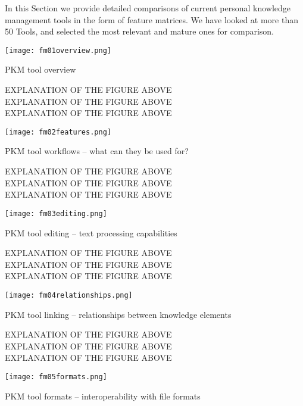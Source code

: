 In this Section we provide detailed comparisons of current personal knowledge management tools in the form of feature matrices. We have looked at more than 50 Tools, and selected the most relevant and mature ones for comparison.

\begin{table}[H]
    \centering
    \texttt{[image: fm01overview.png]}
    \caption{PKM tool overview}
    \label{fig:fm01}
\end{table}

EXPLANATION OF THE FIGURE ABOVE \\
EXPLANATION OF THE FIGURE ABOVE \\
EXPLANATION OF THE FIGURE ABOVE \\


\begin{table}[H]
    \centering
    \texttt{[image: fm02features.png]}
    \caption{PKM tool workflows -- what can they be used for?}
    \label{fig:fm02}
\end{table}

EXPLANATION OF THE FIGURE ABOVE \\
EXPLANATION OF THE FIGURE ABOVE \\
EXPLANATION OF THE FIGURE ABOVE \\


\begin{table}[H]
    \centering
    \texttt{[image: fm03editing.png]}
    \caption{PKM tool editing -- text processing capabilities}
    \label{fig:fm03}
\end{table}

EXPLANATION OF THE FIGURE ABOVE \\
EXPLANATION OF THE FIGURE ABOVE \\
EXPLANATION OF THE FIGURE ABOVE \\


\begin{table}[H]
    \centering
    \texttt{[image: fm04relationships.png]}
    \caption{PKM tool linking -- relationships between knowledge elements}
    \label{fig:fm04}
\end{table}

EXPLANATION OF THE FIGURE ABOVE \\
EXPLANATION OF THE FIGURE ABOVE \\
EXPLANATION OF THE FIGURE ABOVE \\


\begin{table}[H]
    \centering
    \texttt{[image: fm05formats.png]}
    \caption{PKM tool formats -- interoperability with file formats}
    \label{fig:fm05}
\end{table}

